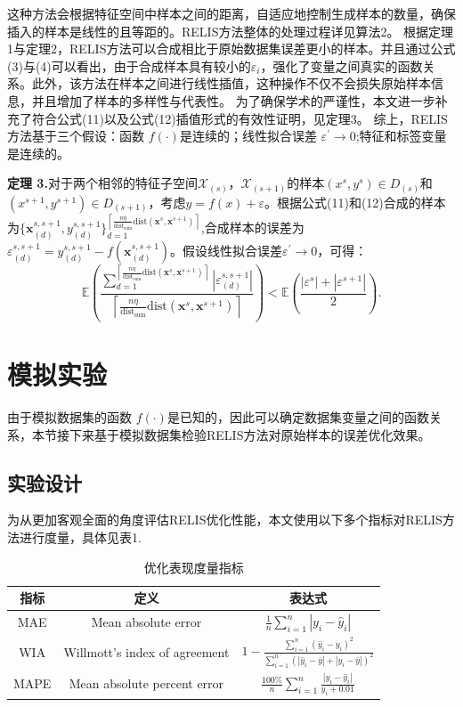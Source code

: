 \documentclass[12pt,a4paper]{article}%
\begin{document}
	这种方法会根据特征空间中样本之间的距离，自适应地控制生成样本的数量，确保插入的样本是线性的且等距的。RELIS方法整体的处理过程详见算法2。
	根据定理1与定理2，RELIS方法可以合成相比于原始数据集误差更小的样本。并且通过公式(3)与(4)可以看出，由于合成样本具有较小的$\varepsilon_i$，强化了变量之间真实的函数关系。此外，该方法在样本之间进行线性插值，这种操作不仅不会损失原始样本信息，并且增加了样本的多样性与代表性。
	为了确保学术的严谨性，本文进一步补充了符合公式(11)以及公式(12)插值形式的有效性证明，见定理3。
	综上，RELIS方法基于三个假设：函数 $f(\cdot)$是连续的；线性拟合误差 $\varepsilon^\prime\rightarrow0$;特征和标签变量是连续的。
	
	\textbf{定理 3.}对于两个相邻的特征子空间$\mathcal{X}_{(s)}$，$\mathcal{X}_{(s+1)}$的样本$(x^s,y^s)\in{D}_{(s)}$和$(x^{s+1},y^{s+1})\in{D}_{(s+1)}$，考虑$y=f(x)+\varepsilon$。根据公式(11)和(12)合成的样本为$\{\boldsymbol{x}_{(d)}^{s,s+1},y_{(d)}^{s,s+1} \}_{d=1}^{\left\lceil \frac{n\eta }{\text{dist}_{\text{sum}}}\text{dist}(\boldsymbol{x}^s,\boldsymbol{x}^{s+1})\right\rceil}$,合成样本的误差为$\varepsilon^{s,s+1}_{(d)}=y_{(d)}^{s,s+1}-f(\boldsymbol{x}_{(d)}^{s,s+1})$。假设线性拟合误差$\varepsilon^\prime\rightarrow0$，可得：
	$$\mathbb{E}(\frac{\textstyle\sum_{d=1}^{{\left\lceil \frac{n\eta }{\text{dist}_{\text{sum}}}\text{dist}(\boldsymbol{x}^s,\boldsymbol{x}^{s+1})\right\rceil}}{|\varepsilon^{s,s+1}_{(d)}|}}{\left\lceil \frac{n\eta }{\text{dist}_{\text{sum}}}\text{dist}(\boldsymbol{x}^s,\boldsymbol{x}^{s+1})\right\rceil})<\mathbb{E}(\frac{|\varepsilon^s|+|\varepsilon^{s+1}|}{2}).$$
	

	
	
	\section{模拟实验}

	由于模拟数据集的函数 $f(\cdot)$是已知的，因此可以确定数据集变量之间的函数关系，本节接下来基于模拟数据集检验RELIS方法对原始样本的误差优化效果。
		
	\subsection{实验设计}

	为从更加客观全面的角度评估RELIS优化性能，本文使用以下多个指标对RELIS方法进行度量，具体见表1.

	\begin{table}[t!]
		\centering
		\caption{优化表现度量指标}
		\begin{tabular}{ccc}
		\hline
		指标 & 定义 & 表达式 \\ \hline
		MAE & Mean absolute error & \( \frac{1}{n} \sum\limits_{i=1}^{n} |y_i - \hat{y}_i| \) \\
		WIA & Willmott's index of agreement & \( 1 - \frac{\sum\limits_{i=1}^{n} (\hat{y}_i - y_i)^2}{\sum\limits_{i=1}^{n} (|\hat{y}_i - \bar{y}| + |y_i - \bar{y}|)^2} \) \\
		MAPE & Mean absolute percent error & \( \frac{100\%}{n} \sum\limits_{i=1}^{n} \frac{|y_i - \hat{y}_i|}{y_i + 0.01} \) \\ \hline
		\end{tabular}
		\label{tab1}
	\end{table}
\end{document}
